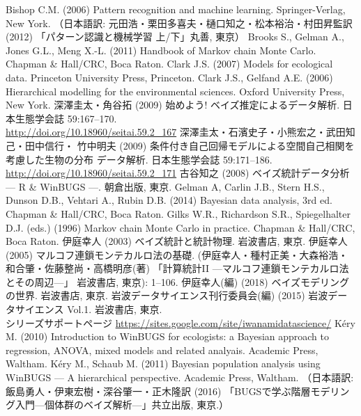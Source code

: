 \documentclass[11pt,uplatex]{jsarticle}
\begin{document}
\begin{thebibliography}{99}
 Bishop C.M. (2006) Pattern recognition and machine learning.
  Springer-Verlag, New York.
  （日本語訳: 元田浩・栗田多喜夫・樋口知之・松本裕治・村田昇監訳 (2012)
  「パターン認識と機械学習 上/下」丸善, 東京）
 Brooks S., Gelman A., Jones G.L., Meng X.-L. (2011)
Handbook of Markov chain Monte Carlo. Chapman \& Hall/CRC, Boca Raton. 
 Clark J.S. (2007) Models for ecological data.
  Princeton University Press, Princeton.
 Clark J.S., Gelfand A.E. (2006) Hierarchical modelling
  for the environmental sciences. Oxford University Press, New York.
 深澤圭太・角谷拓 (2009) 始めよう! ベイズ推定によるデータ解析.
  日本生態学会誌 59:167--170.\\
  \url{http://doi.org/10.18960/seitai.59.2_167}
 深澤圭太・石濱史子・小熊宏之・武田知己・田中信行・
  竹中明夫 (2009) 条件付き自己回帰モデルによる空間自己相関を考慮した生物の分布
  データ解析. 日本生態学会誌 59:171--186. \\
  \url{http://doi.org/10.18960/seitai.59.2_171}
 古谷知之 (2008) ベイズ統計データ分析 --- R \& WinBUGS ---.
  朝倉出版, 東京.
 Gelman A, Carlin J.B., Stern H.S., Dunson D.B., Vehtari A.,
  Rubin D.B. (2014) Bayesian data analysis, 3rd ed.
  Chapman \& Hall/CRC, Boca Raton.
 Gilks W.R., Richardson S.R., Spiegelhalter D.J. (eds.) (1996)
  Markov chain Monte Carlo in practice. Chapman \& Hall/CRC, Boca Raton.
 伊庭幸人 (2003) ベイズ統計と統計物理. 岩波書店, 東京.
 伊庭幸人 (2005) マルコフ連鎖モンテカルロ法の基礎. 
  (伊庭幸人・種村正美・大森裕浩・和合肇・佐藤整尚・高橋明彦(著)
  「計算統計II ---マルコフ連鎖モンテカルロ法とその周辺---」
  岩波書店, 東京): 1--106.
 伊庭幸人(編) (2018) ベイズモデリングの世界. 岩波書店, 東京.
 岩波データサイエンス刊行委員会(編) (2015) 岩波データサイエンス Vol.1.
岩波書店, 東京. \\
シリーズサポートページ \url{https://sites.google.com/site/iwanamidatascience/}
 K\'ery M. (2010) Introduction to WinBUGS for ecologists:
  a Bayesian approach to regression, ANOVA, mixed models and related analyais.
  Academic Press, Waltham.
 K\'ery M., Schaub M. (2011) Bayesian population analysis using WinBUGS --- A hierarchical perspective.
  Academic Press, Waltham.
    （日本語訳: 飯島勇人・伊東宏樹・深谷肇一・正木隆訳 (2016) 「BUGSで学ぶ階層モデリング入門---個体群のベイズ解析---」共立出版, 東京.）

\end{thebibliography}
\end{document}
